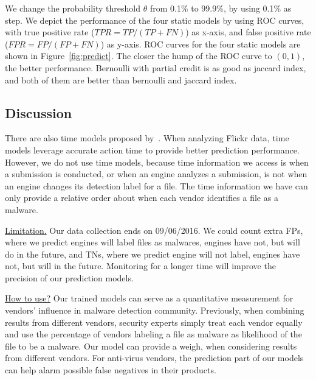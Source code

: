 We change the probability threshold $\theta$ from 0.1\% to 99.9\%, 
by using 0.1\% as step. 
We depict the performance of the four static models by using ROC curves, 
with true positive rate ($TPR = TP/(TP+FN)$) as x-axis, 
and false positive rate ($FPR = FP/(FP + FN)$) as y-axis. 
ROC curves for the four static models are shown in Figure~\ref{fig:predict}. 
The closer the hump of the ROC curve to $(0,1)$, the better performance.
Bernoulli with partial credit is as good as jaccard index, 
and both of them are better than bernoulli and jaccard index. 


\subsection{Discussion}

There are also time models proposed by~\citet{Influence}.
When analyzing Flickr data, time models leverage accurate action time to provide better prediction performance. 
However, we do not use time models, 
because time information we access is when a submission is conducted, 
or when an engine analyzes a submission, 
is not when an engine changes its detection label for a file.
The time information we have can only provide a relative order about when each vendor identifies a file as a malware.  

\underline{Limitation.}
Our data collection ends on 09/06/2016. 
We could count extra FPs, where we predict engines will label files as malwares, engines have not, but will do in the future, 
and TNs, where we predict engine will not label, engines have not, but will in the future. 
Monitoring \vt for a longer time will improve the precision of our prediction models. 

\underline{How to use?}
Our trained models can serve as 
a quantitative measurement for vendors’ influence in malware detection community. 
Previously, when combining results from different vendors, 
security experts simply treat each vendor equally and use the percentage of 
vendors labeling a file as malware as likelihood of the file to be a malware. 
Our model can provide a weigh, when considering results from different vendors.  
For anti-virus vendors, the prediction part of our models can help alarm possible false negatives in their products.